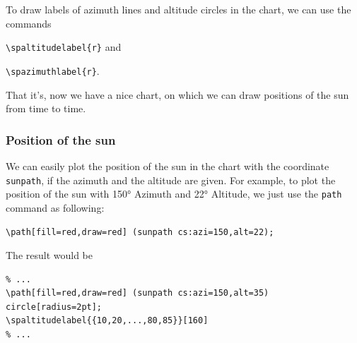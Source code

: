

To draw labels of azimuth lines and altitude circles in the chart, we can use the commands 

\verb:\spaltitudelabel{r}: and

\verb:\spazimuthlabel{r}:.


That it's, now we have a nice chart, on which we can draw positions of the sun from time to time.

\subsubsection{Position of the sun}

We can easily plot the position of the sun in the chart with the coordinate \texttt{sunpath}, 
if the azimuth and the altitude are given.
For example, to plot the position of the sun with 150° Azimuth and 22° Altitude, 
we just use the \texttt{path} command as following:

\verb|\path[fill=red,draw=red] (sunpath cs:azi=150,alt=22);|

The result would be

\begin{verbatim}
% ...
\path[fill=red,draw=red] (sunpath cs:azi=150,alt=35) circle[radius=2pt];
\spaltitudelabel{{10,20,...,80,85}}[160]
% ...
\end{verbatim}


